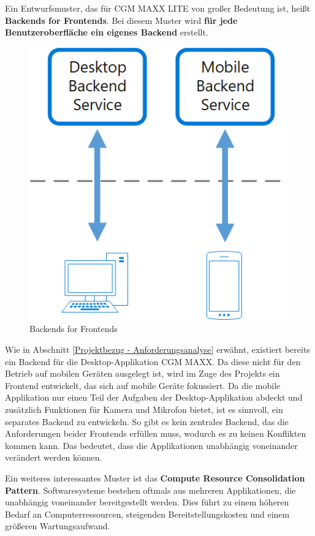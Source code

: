     Ein Entwurfsmuster, das für CGM MAXX LITE von großer Bedeutung ist, heißt \\ \textbf{Backends for Frontends}. 
    Bei diesem Muster wird \textbf{für jede Benutzeroberfläche ein eigenes Backend} erstellt. 

    \begin{figure}[H]
        \centering
        \includegraphics[width=0.45\linewidth]{images/EA/backend-for-frontend.png}
        \caption{Backends for Frontends \\ \cite{EA:Web32}}
        \label{fig:backend-for-frontend}
    \end{figure}

    Wie in Abschnitt \ref{Projektbezug - Anforderungsanalyse} erwähnt, existiert bereits ein Backend für die Desktop-Applikation CGM MAXX. Da diese nicht für den Betrieb auf mobilen Geräten ausgelegt ist, wird im Zuge des Projekts ein Frontend entwickelt, das sich auf mobile Geräte fokussiert. 
    Da die mobile Applikation nur einen Teil der Aufgaben der Desktop-Applikation abdeckt und zusätzlich Funktionen für Kamera und Mikrofon bietet, ist es sinnvoll, ein separates Backend zu entwickeln. So gibt es kein zentrales Backend, das die Anforderungen beider Frontends erfüllen muss, wodurch es zu keinen Konflikten kommen kann. Das bedeutet, dass die Applikationen unabhängig voneinander verändert werden können.
    \cite{EA:Web32}

    \clearpage

    Ein weiteres interessantes Muster ist das \textbf{Compute Resource Consolidation Pattern}.
    Softwaresysteme bestehen oftmals aus mehreren Applikationen, die unabhängig voneinander bereitgestellt werden.
    Dies führt zu einem höheren Bedarf an Computerressourcen, steigenden Bereitstellungskosten und einem größeren Wartungsaufwand. \\

